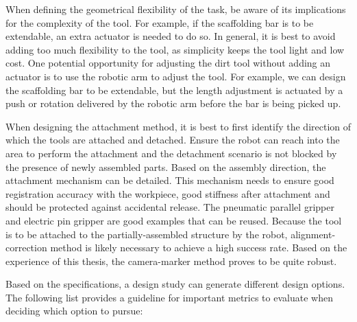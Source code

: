When defining the geometrical flexibility of the task, be aware of its implications for the complexity of the tool. For example, if the scaffolding bar is to be extendable, an extra actuator is needed to do so. In general, it is best to avoid adding too much flexibility to the tool, as simplicity keeps the tool light and low cost. One potential opportunity for adjusting the dirt tool without adding an actuator is to use the robotic arm to adjust the tool. For example, we can design the scaffolding bar to be extendable, but the length adjustment is actuated by a push or rotation delivered by the robotic arm before the bar is being picked up.

When designing the attachment method, it is best to first identify the direction of which the tools are attached and detached. Ensure the robot can reach into the area to perform the attachment and the detachment scenario is not blocked by the presence of newly assembled parts. Based on the assembly direction, the attachment mechanism can be detailed. This mechanism needs to ensure good registration accuracy with the workpiece, good stiffness after attachment and should be protected against accidental release. The pneumatic parallel gripper and electric pin gripper are good examples that can be reused. Because the tool is to be attached to the partially-assembled structure by the robot, alignment-correction method is likely necessary to achieve a high success rate. Based on the experience of this thesis, the camera-marker method proves to be quite robust. 

Based on the specifications, a design study can generate different design options. The following list provides a guideline for important metrics to evaluate when deciding which option to pursue:

